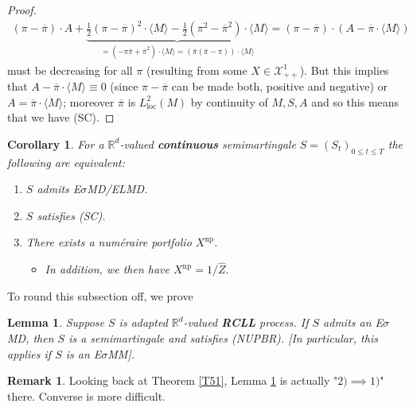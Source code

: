 \documentclass[12pt,a4paper, twoside]{article}
\newtheorem{lem}{Lemma}[section]
\newtheorem{cor}{Corollary}[section]
\theoremstyle{definition}
\newtheorem{rem}{Remark}[section]
\begin{document}
\begin{proof}
\begin{align*}
( \pi- \overline{\pi}) \cdot A + \underbrace{\frac{1}{2}( \pi- \overline{\pi})^2 \cdot \langle M \rangle - \frac{1}{2}( \pi^2 - \overline{\pi}^2) \cdot \langle M \rangle}_{= \displaystyle (- \pi \overline{\pi}+ \overline{\pi}^2) \cdot \langle M \rangle = ( \overline{\pi}( \overline{\pi}- \pi)) \cdot \langle M \rangle} = ( \pi- \overline{\pi}) \cdot (A- \overline{\pi} \cdot \langle M \rangle)
\end{align*}
must be decreasing for all $\pi$ (resulting from some $X \in \mathcal{X}_{++}^1$). But this implies that $A- \overline{\pi} \cdot \langle M \rangle \equiv 0$ (since $\pi- \overline{\pi}$ can be made both, positive and negative) or $A= \overline{\pi} \cdot \langle M \rangle$; moreover $\overline{\pi}$ is $L_\text{loc}^2(M)$ by continuity of $M,S,A$ and so this means that we have (SC). 
\end{proof}
\begin{cor} \label{C57} For a $\mathbb{R}^d$-valued \textbf{continuous} semimartingale $S=(S_t)_{0 \leq t\leq T}$ the following are equivalent:
\begin{enumerate}
\item $S$ admits E$\sigma$MD/ELMD.
\item $S$ satisfies (SC).
\item There exists a numéraire portfolio $X^\text{np}$.
\begin{itemize}
\item In addition, we then have $X^\text{np}=1/\hat{Z}.$
\end{itemize}
\end{enumerate}
\end{cor}
\newpage
To round this subsection off, we prove
\begin{lem} \label{L58} Suppose $S$ is adapted $\mathbb{R}^d$-valued \textbf{RCLL} process. If $S$ admits an E$\sigma$MD, then $S$ is a semimartingale and satisfies (NUPBR). [In particular, this applies if $S$ is an E$\sigma$MM].
\end{lem}
\begin{rem} Looking back at Theorem \ref{T51}, Lemma \ref{L58} is actually "$2)\implies 1)$" there. Converse is more difficult. 
\end{rem}
\end{document}

